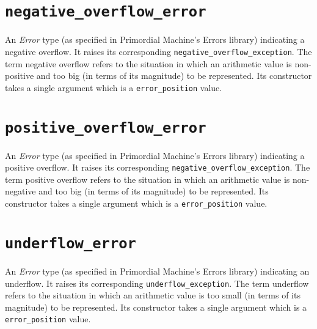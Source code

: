 \documentclass[oneside]{book}
\begin{document}
\section{\texttt{negative\_overflow\_error}}
An \textit{Error} type (as specified in Primordial Machine's Errors library) indicating a negative overflow.
It raises its corresponding \texttt{negative\_overflow\_exception}.
The term negative overflow refers to the situation in which an arithmetic value is non-positive and
too big (in terms of its magnitude) to be represented. Its constructor takes a single argument which
is a \texttt{error\_position} value.

\section{\texttt{positive\_overflow\_error}}
An \textit{Error} type (as specified in Primordial Machine's Errors library) indicating a positive overflow.
It raises its corresponding \texttt{negative\_overflow\_exception}.
The term positive overflow refers to the situation in which an arithmetic value is non-negative and
too big (in terms of its magnitude) to be represented. Its constructor takes a single argument which
is a \texttt{error\_position} value.

\section{\texttt{underflow\_error}}
An \textit{Error} type (as specified in Primordial Machine's Errors library) indicating an underflow.
It raises its corresponding \texttt{underflow\_exception}.
The term underflow refers to the situation in which an arithmetic value is too small (in terms of
its magnitude) to be represented. Its constructor takes a single argument which
is a \texttt{error\_position} value.
\end{document}
